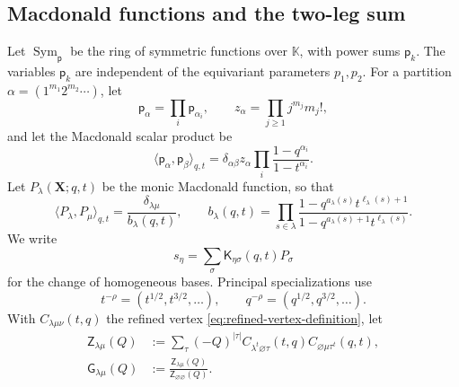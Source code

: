 \documentclass{amsart}
\theoremstyle{definition}
\numberwithin{equation}{section}
\newcommand{\K}{\mathbb K}
\begin{document}
\subsection{Macdonald functions and the two-leg sum}
Let \(\operatorname{Sym}_{\mathsf p}\) be the ring of symmetric functions over \(\K\), with power sums \(\mathsf p_k\).  The variables \(\mathsf p_k\) are independent of the equivariant parameters \(p_1,p_2\).  For a partition \(\alpha=(1^{m_1}2^{m_2}\cdots)\), let
\[
 \mathsf p_\alpha=\prod_i \mathsf p_{\alpha_i},\qquad
 z_\alpha=\prod_{j\geq1}j^{m_j}m_j!,
\]
and let the Macdonald scalar product \cite[Chapter~VI]{Macdonald} be
\begin{equation}
 \langle \mathsf p_\alpha,\mathsf p_\beta\rangle_{q,t}
 =\delta_{\alpha\beta}z_\alpha
 \prod_i\frac{1-q^{\alpha_i}}{1-t^{\alpha_i}}.
\label{eq:Macdonald-scalar-product}
\end{equation}
Let \(P_\lambda(\mathbf X;q,t)\) be the monic Macdonald function, so that
\begin{equation}
 \langle P_\lambda,P_\mu\rangle_{q,t}
 =\frac{\delta_{\lambda\mu}}{b_\lambda(q,t)},
 \qquad
 b_\lambda(q,t)=
 \prod_{s\in\lambda}
 \frac{1-q^{a_\lambda(s)}t^{\ell_\lambda(s)+1}}
      {1-q^{a_\lambda(s)+1}t^{\ell_\lambda(s)}}.
\label{eq:Macdonald-norm}
\end{equation}
We write
\begin{equation}
 s_\eta=\sum_\sigma \mathsf K_{\eta\sigma}(q,t)P_\sigma
\label{eq:Schur-Macdonald-change}
\end{equation}
for the change of homogeneous bases.  Principal specializations use
\[
 t^{-\rho}=(t^{1/2},t^{3/2},\ldots),\qquad
 q^{-\rho}=(q^{1/2},q^{3/2},\ldots).
\]
With \(C_{\lambda\mu\nu}(t,q)\) the refined vertex \eqref{eq:refined-vertex-definition}, let
\begin{align}
 \mathsf Z_{\lambda\mu}(Q)
 &:=
 \sum_\tau(-Q)^{|\tau|}
 C_{\lambda^t\varnothing\tau}(t,q)
 C_{\varnothing\mu\tau^t}(q,t),
 \label{eq:two-leg-Z}\\
 \mathsf G_{\lambda\mu}(Q)
 &:=
 \frac{\mathsf Z_{\lambda\mu}(Q)}
 {\mathsf Z_{\varnothing\varnothing}(Q)}.
 \label{eq:two-leg-G}
\end{align}
\end{document}

